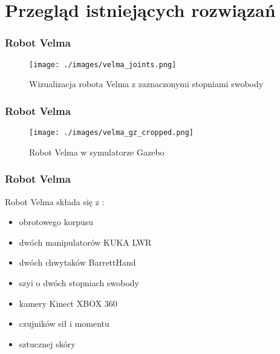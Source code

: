 \section{Przegląd istniejących rozwiązań}


\begin{frame}
\frametitle{Robot Velma}
\begin{figure}
\texttt{[image: ./images/velma\_joints.png]}
\caption{Wizualizacja robota Velma z zaznaczonymi stopniami swobody \cite{docsVelma}}
\end{figure}
\end{frame}


\begin{frame}
\frametitle{Robot Velma}
\begin{figure}
	\texttt{[image: ./images/velma\_gz\_cropped.png]}
	\caption{Robot Velma w symulatorze Gazebo}
\end{figure}
\end{frame}


\begin{frame}
\frametitle{Robot Velma}
Robot Velma składa się z \cite{docsVelma}:  
\begin{itemize}
	\item obrotowego korpusu
	\item dwóch manipulatorów KUKA LWR
	\item dwóch chwytaków BarrettHand
	\item szyi o dwóch stopniach swobody
	\item kamery Kinect XBOX 360
	\item czujników sił i momentu
	\item sztucznej skóry
\end{itemize}
\end{frame}


